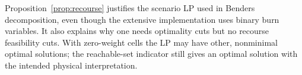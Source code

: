Proposition~\ref{prop:recourse} justifies the scenario LP used in Benders
decomposition, even though the extensive implementation uses binary burn
variables. It also explains why one needs optimality cuts but no recourse
feasibility cuts. With zero-weight cells the LP may have other, nonminimal
optimal solutions; the reachable-set indicator still gives an optimal
solution with the intended physical interpretation.

